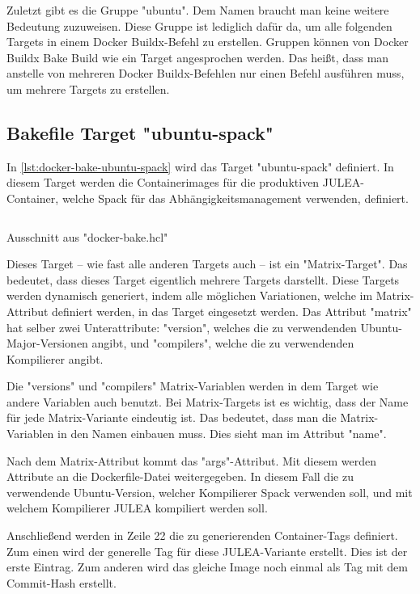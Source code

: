 Zuletzt gibt es die Gruppe "ubuntu". Dem Namen braucht man keine weitere Bedeutung zuzuweisen. Diese Gruppe ist lediglich dafür da, um alle folgenden Targets in einem Docker Buildx-Befehl zu erstellen. Gruppen können von Docker Buildx Bake Build wie ein Target angesprochen werden. Das heißt, dass man anstelle von mehreren Docker Buildx-Befehlen nur einen Befehl ausführen muss, um mehrere Targets zu erstellen.

\subsection{Bakefile Target "ubuntu-spack"} \label{ubuntu-spack-target}

In \cref{lst:docker-bake-ubuntu-spack} wird das Target "ubuntu-spack" definiert. In diesem Target werden die Containerimages für die produktiven JULEA-Container, welche Spack für das Abhängigkeitsmanagement verwenden, definiert.

\begin{listing}[H]
    \inputminted[firstline=9,lastline=27]{./lexers/docker-bake-lexer.py}{./code-examples/docker-bake.hcl}
    \caption{Ausschnitt aus "docker-bake.hcl"}
    \label{lst:docker-bake-ubuntu-spack}
\end{listing}

Dieses Target – wie fast alle anderen Targets auch – ist ein "Matrix-Target". Das bedeutet, dass dieses Target eigentlich mehrere Targets darstellt. Diese Targets werden dynamisch generiert, indem alle möglichen Variationen, welche im Matrix-Attribut definiert werden, in das Target eingesetzt werden. Das Attribut "matrix" hat selber zwei Unterattribute: "version", welches die zu verwendenden Ubuntu-Major-Versionen angibt, und "compilers", welche die zu verwendenden Kompilierer angibt.

Die "versions" und "compilers" Matrix-Variablen werden in dem Target wie andere Variablen auch benutzt. 
Bei Matrix-Targets ist es wichtig, dass der Name für jede Matrix-Variante eindeutig ist. Das bedeutet, dass man die Matrix-Variablen in den Namen einbauen muss. Dies sieht man im Attribut "name".

Nach dem Matrix-Attribut kommt das "args"-Attribut. Mit diesem werden Attribute an die Dockerfile-Datei weitergegeben. In diesem Fall die zu verwendende Ubuntu-Version, welcher Kompilierer Spack verwenden soll, und mit welchem Kompilierer JULEA kompiliert werden soll. 

Anschließend werden in Zeile 22 die zu generierenden Container-Tags definiert. Zum einen wird der generelle Tag für diese JULEA-Variante erstellt. Dies ist der erste Eintrag. Zum anderen wird das gleiche Image noch einmal als Tag mit dem Commit-Hash erstellt.

